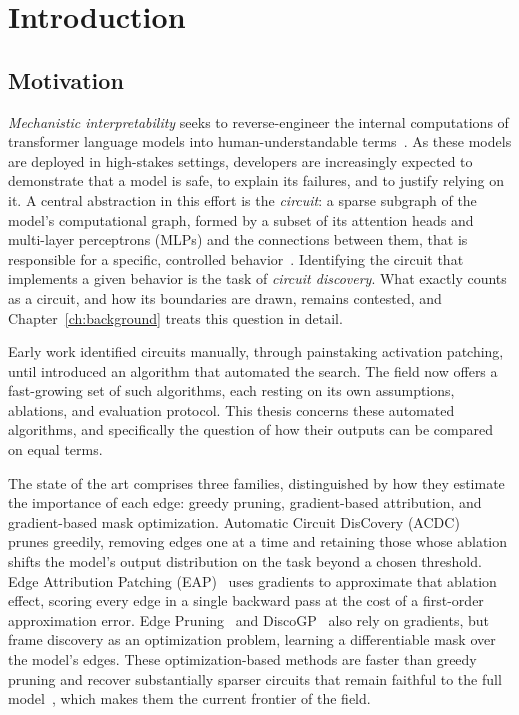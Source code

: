 \chapter{Introduction}\label{ch:introduction}

\section{Motivation}\label{sec:motivation}

\emph{Mechanistic interpretability} seeks to reverse-engineer the internal computations of transformer language models into human-understandable terms~\citep{olah2020zoom, elhage2021mathematical}. As these models are deployed in high-stakes settings, developers are increasingly expected to demonstrate that a model is safe, to explain its failures, and to justify relying on it. A central abstraction in this effort is the \emph{circuit}: a sparse subgraph of the model's computational graph, formed by a subset of its attention heads and multi-layer perceptrons (MLPs) and the connections between them, that is responsible for a specific, controlled behavior~\citep{wang2023interpretability}. Identifying the circuit that implements a given behavior is the task of \emph{circuit discovery}. What exactly counts as a circuit, and how its boundaries are drawn, remains contested, and Chapter~\ref{ch:background} treats this question in detail.

Early work identified circuits manually, through painstaking activation patching, until \citet{acdc} introduced an algorithm that automated the search. The field now offers a fast-growing set of such algorithms, each resting on its own assumptions, ablations, and evaluation protocol. This thesis concerns these automated algorithms, and specifically the question of how their outputs can be compared on equal terms.

The state of the art comprises three families, distinguished by how they estimate the importance of each edge: greedy pruning, gradient-based attribution, and gradient-based mask optimization. Automatic Circuit DisCovery (ACDC)~\citep{acdc} prunes greedily, removing edges one at a time and retaining those whose ablation shifts the model's output distribution on the task beyond a chosen threshold. Edge Attribution Patching (EAP)~\citep{syed-etal-2024-attribution} uses gradients to approximate that ablation effect, scoring every edge in a single backward pass at the cost of a first-order approximation error. Edge Pruning~\citep{edgePruning} and DiscoGP~\citep{yu-etal-2025-sheaf} also rely on gradients, but frame discovery as an optimization problem, learning a differentiable mask over the model's edges. These optimization-based methods are faster than greedy pruning and recover substantially sparser circuits that remain faithful to the full model~\citep{edgePruning, yu-etal-2025-sheaf}, which makes them the current frontier of the field.

